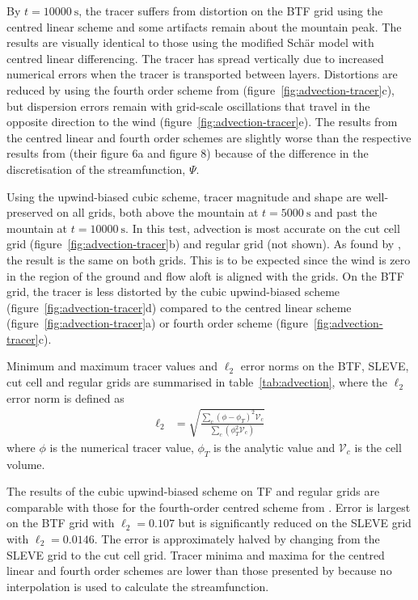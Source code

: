 \documentclass{ametsoc}
\begin{document}
By \(t = \SI{10000}{\second}\), the tracer suffers from distortion on the BTF grid using the centred linear scheme and some artifacts remain about the mountain peak.  The results are visually identical to those using the modified Sch\"{a}r model with centred linear differencing.
The tracer has spread vertically due to increased numerical errors when the tracer is transported between layers.  Distortions are reduced by using the fourth order scheme from \citet{schaer2002} (figure~\ref{fig:advection-tracer}c), but dispersion errors remain with grid-scale oscillations that travel in the opposite direction to the wind (figure~\ref{fig:advection-tracer}e).  The results from the centred linear and fourth order schemes are slightly worse than the respective results from \citet{schaer2002} (their figure 6a and figure 8) because of the difference in the discretisation of the streamfunction, $\Psi$.

Using the upwind-biased cubic scheme, tracer magnitude and shape are well-preserved on all grids, both above the mountain at \(t = \SI{5000}{\second}\) and past the mountain at \(t = \SI{10000}{\second}\).  In this test, advection is most accurate on the cut cell grid (figure~\ref{fig:advection-tracer}b) and regular grid (not shown).  As found by \citet{good2014}, the result is the same on both grids.  This is to be expected since the wind is zero in the region of the ground and flow aloft is aligned with the grids.  On the BTF grid, the tracer is less distorted by the cubic upwind-biased scheme (figure~\ref{fig:advection-tracer}d) compared to the centred linear scheme (figure~\ref{fig:advection-tracer}a) or fourth order scheme (figure~\ref{fig:advection-tracer}c).

Minimum and maximum tracer values and \(\ell_2\) error norms on the BTF, SLEVE, cut cell and regular grids are summarised in table~\ref{tab:advection}, where the \(\ell_2\) error norm is defined as 
\begin{align}
	\ell_2 &= \sqrt{\frac{\sum_c \left( \phi - \phi_{T} \right)^2 \mathcal{V}_c}{\sum_c \left( \phi_T^2 \mathcal{V}_c \right)}} \label{eqn:l2-error}
\end{align}
where $\phi$ is the numerical tracer value, $\phi_T$ is the analytic value and $\mathcal{V}_c$ is the cell volume.

The results of the cubic upwind-biased scheme on TF and regular grids are comparable with those for the fourth-order centred scheme from \citet{schaer2002}.  Error is largest on the BTF grid with \(\ell_2 = \num{0.107}\) but is significantly reduced on the SLEVE grid with \(\ell_2 = \num{0.0146}\).  The error is approximately halved by changing from the SLEVE grid to the cut cell grid.
Tracer minima and maxima for the centred linear and fourth order schemes are lower than those presented by \citet{schaer2002} because no interpolation is used to calculate the streamfunction.
\end{document}
